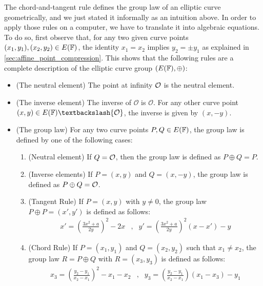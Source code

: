 The chord-and-tangent rule defines the group law of an elliptic curve geometrically, and we just stated it informally as an intuition above. In order to apply those rules on a computer, we have to translate it into algebraic equations. To do so, first observe that, for any two given curve points $(x_1,y_1), (x_2,y_2)\in E(\mathbb{F})$, the identity $x_1=x_2$ implies $y_2=\pm y_1$ as explained in \secname{} \ref{sec:affine_point_compression}. This shows that the following rules are a complete description of the elliptic curve group $(E(\mathbb{F}),\oplus)$:

\begin{definition}\label{def:chord-tangent-algebra}
\begin{itemize}
\item (The neutral element) The point at infinity $\mathcal{O}$ is the neutral element.
\item (The inverse element) The inverse of $\mathcal{O}$ is $\mathcal{O}$. For any other curve point $(x,y) \in E(\F)\textbackslash \{\mathcal{O}\}$, the inverse is given by $(x,-y)$.
\item (The group law) For any two curve points $P, Q \in E(\mathbb{F})$, the group law is defined by one of the following cases:
\begin{enumerate}
\item (Neutral element) If $Q=\mathcal{O}$, then the group law is defined as $P\oplus Q=P$.
\item (Inverse elements)  If $P=(x,y)$ and $Q=(x,-y)$, the group law is defined as $P\oplus Q=\mathcal{O}$.
\item (Tangent Rule) If $P=(x,y)$ with $y\neq 0$, the group law $P\oplus P=(x',y')$ is defined as follows:
$$
\begin{array}{llr}
x' = \left(\frac{3x^2+a}{2y}\right)^2 -2x &,&
y' = \left(\frac{3x^2+a}{2y}\right)^2\left(x-x'\right) - y
\end{array} 
$$
\item (Chord Rule) If $P=(x_1,y_1)$ and $Q=(x_2,y_2)$ such that $x_1 \neq x_2$, the group law $R=P\oplus Q$ with $R=(x_3,y_3)$ is defined as follows:
$$
\begin{array}{llr}
x_3 = \left(\frac{y_2-y_1}{x_2-x_1}\right)^2 -x_1-x_2 &, &
y_3 = \left(\frac{y_2-y_1}{x_2-x_1} \right)\left(x_1-x_3\right) - y_1
\end{array} 
$$
\end{enumerate}
\end{itemize}
\end{definition}
